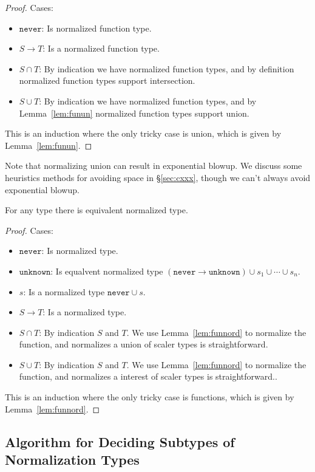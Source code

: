 \documentclass[acmsmall,review,screen]{acmart}
\newcommand{\NEVER}{\mathtt{never}}
\newcommand{\UNKNOWN}{\mathtt{unknown}}
\newcommand{\fun}{\mathbin{\rightarrow}}
\begin{document}
\begin{proof}
  Cases:
  \begin{itemize}
  \item $\NEVER$: Is normalized function type.
  \item $S \fun T$: Is a normalized function type.
  \item $S \cap T$: By indication we have normalized function types,
    and by definition normalized function types support intersection.
  \item $S \cup T$: By indication we have normalized function types,
    and by Lemma~\ref{lem:funun} normalized function types support union.
  \end{itemize}
  This is an induction where the only tricky case is union, which is given by Lemma~\ref{lem:funun}.
\end{proof}
Note that normalizing union can result in exponential blowup.
We discuss some heuristics methods for avoiding space in \S\ref{sec:cxxx},
though we can't always avoid exponential blowup.

\begin{lemma}
  For any type there is equivalent normalized type.
\end{lemma}

\begin{proof}
  Cases:
  \begin{itemize}
  \item $\NEVER$: Is normalized type.
  \item $\UNKNOWN$: Is equalvent normalized type $(\NEVER \fun \UNKNOWN) \cup s_1 \cup \cdots \cup s_n$.
  \item $s$: Is a normalized type $\NEVER \cup s$.
  \item $S \fun T$: Is a normalized type.
  \item $S \cap T$: By indication $S$ and $T$. We use Lemma~\ref{lem:funnord}
    to normalize the function, and normalizes a union of scaler types is straightforward.
  \item $S \cup T$: By indication $S$ and $T$. We use Lemma~\ref{lem:funnord}
    to normalize the function, and normalizes a interest of scaler types is straightforward..
  \end{itemize}
  This is an induction where the only tricky case is functions, which is given by Lemma~\ref{lem:funnord}.
\end{proof}

\subsection{Algorithm for Deciding Subtypes of Normalization Types}
\label{subsec:algth}
\end{document}

